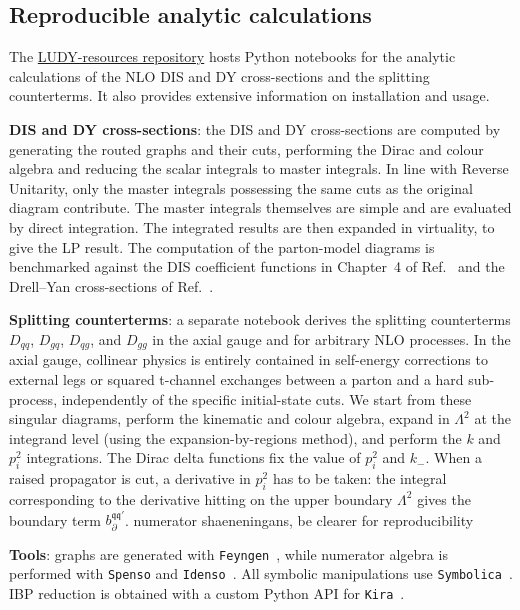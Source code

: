 \documentclass[%
 reprint,
 amsmath,amssymb,
 superscriptaddress,
 aps,
 preprintnumbers,
prl,
floatfix,
]{revtex4-2}
\let\label\latexKernelLabel
\begin{document}
\subsection{Reproducible analytic calculations}
\label{sec:reproducible-analytic-calculations}



The \href{https://github.com/ZenoCapatti/LUDY-resources}{LUDY-resources repository} hosts Python notebooks for the analytic calculations of the NLO DIS and DY cross-sections and the splitting counterterms. It also provides extensive information on installation and usage.

\textbf{DIS and DY cross-sections}: the DIS and DY cross-sections are computed by generating the routed graphs and their cuts, performing the Dirac and colour algebra and reducing the scalar integrals to master integrals. In line with Reverse Unitarity, only the master integrals possessing the same cuts as the original diagram contribute. The master integrals themselves are simple and are evaluated by direct integration. The integrated results are then expanded in virtuality, to give the LP result. The computation of the parton-model diagrams is benchmarked against the DIS coefficient functions in Chapter~4 of Ref.~\cite{Ellis:1996mzs} and the Drell--Yan cross-sections of Ref.~\cite{Altarelli:1979ub}.

\textbf{Splitting counterterms}: a separate notebook derives the splitting counterterms $D_{qq}$, $D_{gq}$, $D_{qg}$, and $D_{gg}$ in the axial gauge and for arbitrary NLO processes. In the axial gauge, collinear physics is entirely contained in self-energy corrections to external legs or squared t-channel exchanges between a parton and a hard sub-process, independently of the specific initial-state cuts. We start from these singular diagrams, perform the kinematic and colour algebra, expand in $\Lambda^2$ at the integrand level (using the expansion-by-regions method), and perform the $k$ and $p_i^2$ integrations. The Dirac delta functions fix the value of $p_i^2$ and $k_{-}$. When a raised propagator is cut, a derivative in $p_i^2$ has to be taken: the integral corresponding to the derivative hitting on the upper boundary $\Lambda^2$ gives the boundary term $b_{\partial}^{\mathfrak{q}\mathfrak{q}'}$. {\color{red} numerator shaeneningans, be clearer for reproducibility}

\textbf{Tools}: graphs are generated with \texttt{Feyngen}~\cite{GammaLoopSoftware}, while numerator algebra is performed with \texttt{Spenso} and \texttt{Idenso}~\cite{SpensoSoftware}. All symbolic manipulations use \texttt{Symbolica}~\cite{SymbolicaSoftware}. IBP reduction is obtained with a custom Python API for \texttt{Kira}~\cite{Klappert_2021}.
\end{document}

